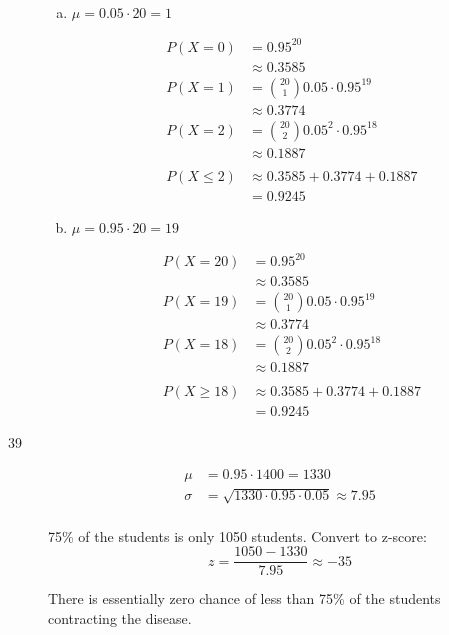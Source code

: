 \documentclass[letterpaper]{exam}
\begin{document}
\begin{description}
        \begin{enumerate}[(a)]
          \item 
            $\mu = 0.05 \cdot 20 = \boxed{ 1 }$

            \begin{align*}
              P(X = 0) & = 0.95^{20} \\
                       & \approx 0.3585 \\
              P(X = 1) & = \binom{20}{1} 0.05 \cdot 0.95^{19} \\
                       & \approx 0.3774 \\
              P(X = 2) & = \binom{20}{2} 0.05^2 \cdot 0.95^{18} \\
                       & \approx 0.1887 \\
                       \\
              P(X \leq 2) & \approx 0.3585 + 0.3774 + 0.1887 \\
                          & = \boxed{ 0.9245 }
            \end{align*}

          \item 
            $\mu = 0.95 \cdot 20 = \boxed{ 19 }$

            \begin{align*}
              P(X = 20) & = 0.95^{20} \\
                        & \approx 0.3585 \\
              P(X = 19) & = \binom{20}{1} 0.05 \cdot 0.95^{19} \\
                        & \approx 0.3774 \\
              P(X = 18) & = \binom{20}{2} 0.05^2 \cdot 0.95^{18} \\
                        & \approx 0.1887 \\
                       \\
              P(X \geq 18) & \approx 0.3585 + 0.3774 + 0.1887 \\
                           & = \boxed{ 0.9245 }
            \end{align*}

        \end{enumerate}

      \item[39]
        \begin{enumerate}[(a)]
          \begin{align*}
            \mu &= 0.95 \cdot 1400 = 1330 \\
            \sigma &= \sqrt{1330 \cdot 0.95 \cdot 0.05} \approx 7.95 \\
          \end{align*}

          75\% of the students is only 1050 students. Convert to z-score:
          \[
            z = \frac{1050 - 1330}{7.95} \approx -35
          \]

          There is essentially zero chance of less than 75\% of the students
          contracting the disease.

        \end{enumerate}
  \end{description}
\end{document}
